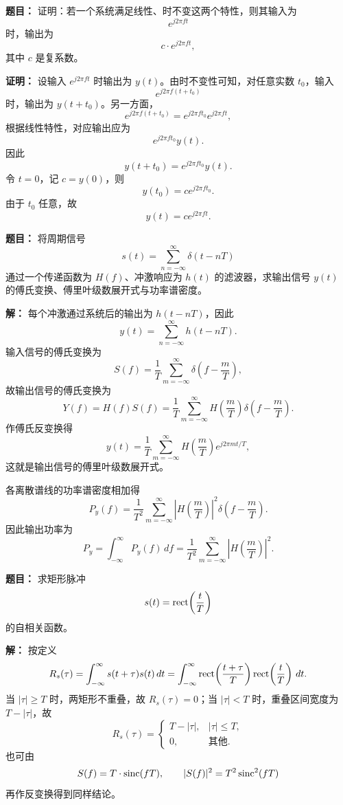 \medskip
{}
\textbf{题目：}
证明：若一个系统满足线性、时不变这两个特性，则其输入为
\[
e^{j2\pi ft}
\]
时，输出为
\[
c\cdot e^{j2\pi ft},
\]
其中 $c$ 是复系数。

\par\textbf{证明：}
设输入 $e^{j2\pi ft}$ 时输出为 $y(t)$。由时不变性可知，对任意实数 $t_0$，输入
\[
e^{j2\pi f(t+t_0)}
\]
时，输出为 $y(t+t_0)$。另一方面，
\[
e^{j2\pi f(t+t_0)}=e^{j2\pi ft_0}e^{j2\pi ft},
\]
根据线性特性，对应输出应为
\[
e^{j2\pi ft_0}y(t).
\]
因此
\[
y(t+t_0)=e^{j2\pi ft_0}y(t).
\]
令 $t=0$，记 $c=y(0)$，则
\[
y(t_0)=ce^{j2\pi ft_0}.
\]
由于 $t_0$ 任意，故
\[
y(t)=ce^{j2\pi ft}.
\]

\medskip
{}
\textbf{题目：}
将周期信号
\[
s(t)=\sum_{n=-\infty}^{\infty}\delta(t-nT)
\]
通过一个传递函数为 $H(f)$、冲激响应为 $h(t)$ 的滤波器，求输出信号 $y(t)$ 的傅氏变换、傅里叶级数展开式与功率谱密度。

\par\textbf{解：}
每个冲激通过系统后的输出为 $h(t-nT)$，因此
\[
y(t)=\sum_{n=-\infty}^{\infty}h(t-nT).
\]
输入信号的傅氏变换为
\[
S(f)=\frac{1}{T}\sum_{m=-\infty}^{\infty}\delta\!\left(f-\frac{m}{T}\right),
\]
故输出信号的傅氏变换为
\[
Y(f)=H(f)S(f)
=\frac{1}{T}\sum_{m=-\infty}^{\infty}H\!\left(\frac{m}{T}\right)\delta\!\left(f-\frac{m}{T}\right).
\]
作傅氏反变换得
\[
y(t)=\frac{1}{T}\sum_{m=-\infty}^{\infty}H\!\left(\frac{m}{T}\right)e^{j2\pi mt/T},
\]
这就是输出信号的傅里叶级数展开式。

各离散谱线的功率谱密度相加得
\[
P_y(f)=\frac{1}{T^2}\sum_{m=-\infty}^{\infty}
\left|H\!\left(\frac{m}{T}\right)\right|^2
\delta\!\left(f-\frac{m}{T}\right).
\]
因此输出功率为
\[
P_y=\int_{-\infty}^{\infty}P_y(f)\,df
=\frac{1}{T^2}\sum_{m=-\infty}^{\infty}
\left|H\!\left(\frac{m}{T}\right)\right|^2.
\]

\medskip
{}
\textbf{题目：}
求矩形脉冲
\[
s(t)=\operatorname{rect}\!\left(\frac{t}{T}\right)
\]
的自相关函数。

\par\textbf{解：}
按定义
\[
R_s(\tau)=\int_{-\infty}^{\infty}s(t+\tau)s(t)\,dt
=\int_{-\infty}^{\infty}\operatorname{rect}\!\left(\frac{t+\tau}{T}\right)\operatorname{rect}\!\left(\frac{t}{T}\right)\,dt.
\]
当 $\lvert\tau\rvert\ge T$ 时，两矩形不重叠，故 $R_s(\tau)=0$；当 $\lvert\tau\rvert<T$ 时，重叠区间宽度为 $T-\lvert\tau\rvert$，故
\[
R_s(\tau)=
\begin{cases}
T-\lvert\tau\rvert,&\lvert\tau\rvert\le T,\\
0,&\text{其他}.
\end{cases}
\]
也可由
\[
S(f)=T\cdot \operatorname{sinc}(fT),\qquad
\lvert S(f)\rvert^2=T^2\operatorname{sinc}^2(fT)
\]
再作反变换得到同样结论。

